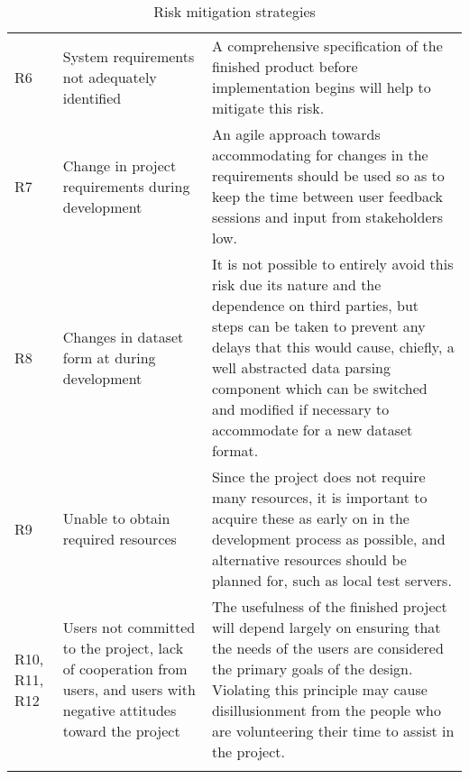 \begin{longtable}{ | p{1.1cm} | p{5cm} | p{8.2cm} | }
R6 & System requirements not adequately identified & A comprehensive
specification of the finished product before implementation begins will help to
mitigate this risk.\\

R7 & Change in project requirements during development & An agile approach
towards accommodating for changes in the requirements should be used so as to
keep the time between user feedback sessions and input from stakeholders low.\\

R8 & Changes in dataset form at during development & It is not possible to
entirely avoid this risk due its nature and the dependence on third parties, but
steps can be taken to prevent any delays that this would cause, chiefly, a well
abstracted data parsing component which can be switched and modified if
necessary to accommodate for a new dataset format.\\

R9 & Unable to obtain required resources & Since the project does not require
many resources, it is important to acquire these as early on in the development
process as possible, and alternative resources should be planned for, such as
local test servers.\\

R10, R11, R12 & Users not committed to the project, lack of cooperation from
users, and users with negative attitudes toward the project & The usefulness of
the finished project will depend largely on ensuring that the needs of the users
are considered the primary goals of the design. Violating this principle may
cause disillusionment from the people who are volunteering their time to assist
in the project.\\

\hline
\caption{Risk mitigation strategies}
\label{tab:risk-mitigation}
\end{longtable}
